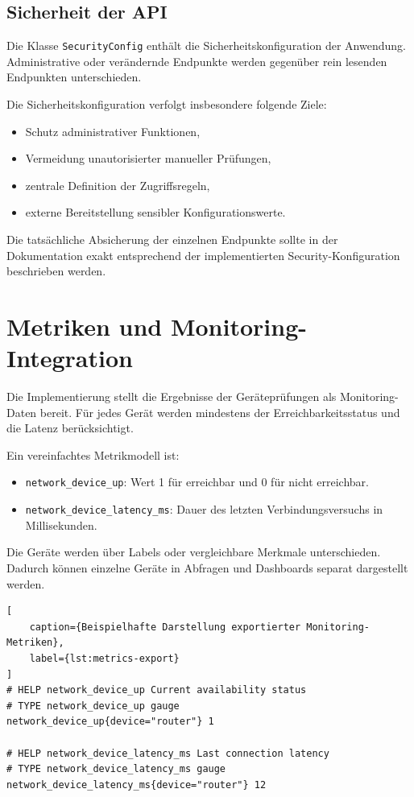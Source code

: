 \subsection{Sicherheit der API}
\label{subsec:api-sicherheit-implementierung}

Die Klasse \texttt{SecurityConfig} enthält die Sicherheitskonfiguration der Anwendung. Administrative oder verändernde Endpunkte werden gegenüber rein lesenden Endpunkten unterschieden.

Die Sicherheitskonfiguration verfolgt insbesondere folgende Ziele:

\begin{itemize}
    \item Schutz administrativer Funktionen,
    \item Vermeidung unautorisierter manueller Prüfungen,
    \item zentrale Definition der Zugriffsregeln,
    \item externe Bereitstellung sensibler Konfigurationswerte.
\end{itemize}

Die tatsächliche Absicherung der einzelnen Endpunkte sollte in der Dokumentation exakt entsprechend der implementierten Security-Konfiguration beschrieben werden.

\section{Metriken und Monitoring-Integration}
\label{sec:metriken-monitoring-integration}

Die Implementierung stellt die Ergebnisse der Geräteprüfungen als Monitoring-Daten bereit. Für jedes Gerät werden mindestens der Erreichbarkeitsstatus und die Latenz berücksichtigt.

Ein vereinfachtes Metrikmodell ist:

\begin{itemize}
    \item \texttt{network\_device\_up}: Wert 1 für erreichbar und 0 für nicht erreichbar.
    \item \texttt{network\_device\_latency\_ms}: Dauer des letzten Verbindungsversuchs in Millisekunden.
\end{itemize}

Die Geräte werden über Labels oder vergleichbare Merkmale unterschieden. Dadurch können einzelne Geräte in Abfragen und Dashboards separat dargestellt werden.

\begin{lstlisting}[
    caption={Beispielhafte Darstellung exportierter Monitoring-Metriken},
    label={lst:metrics-export}
]
# HELP network_device_up Current availability status
# TYPE network_device_up gauge
network_device_up{device="router"} 1

# HELP network_device_latency_ms Last connection latency
# TYPE network_device_latency_ms gauge
network_device_latency_ms{device="router"} 12
\end{lstlisting}

